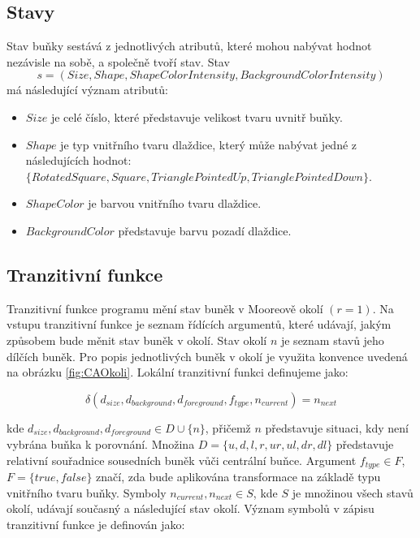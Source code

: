 \subsection*{Stavy}
Stav buňky sestává z jednotlivých atributů, které mohou nabývat hodnot nezávisle na sobě, a společně tvoří stav.
Stav
$$s = (Size, Shape, ShapeColorIntensity, BackgroundColorIntensity)$$ 
má následující význam atributů:

\begin{itemize}
    \item $Size$ je celé číslo, které představuje velikost tvaru uvnitř buňky.
    \item $Shape$ je typ vnitřního tvaru dlaždice, který může nabývat jedné z následujících hodnot: $\{RotatedSquare, Square, TrianglePointedUp, TrianglePointedDown\}$.
    \item $ShapeColor$ je barvou vnitřního tvaru dlaždice.
    \item $BackgroundColor$ představuje barvu pozadí dlaždice.
\end{itemize}

\subsection*{Tranzitivní funkce}
Tranzitivní funkce programu mění stav buněk v Mooreově okolí $(r = 1)$. Na vstupu tranzitivní funkce je seznam řídících argumentů, které udávají, jakým způsobem bude měnit stav buněk v okolí. Stav okolí $n$ je seznam stavů jeho dílčích buněk. Pro popis jednotlivých buněk v okolí je využita konvence uvedená na obrázku \ref{fig:CAOkoli}. Lokální tranzitivní funkci definujeme jako:

$$\delta(d_{size}, d_{background}, d_{foreground}, f_{type}, n_{current}) = n_{next} $$ 

kde $d_{size}, d_{background}, d_{foreground} \in D \cup \{n\}$, přičemž $n$ představuje situaci, kdy není vybrána buňka k porovnání. Množina $D = \{u, d, l, r, ur, ul, dr, dl\}$ představuje relativní souřadnice sousedních buněk vůči centrální buňce.   Argument $f_{type} \in F$, $F = \{true, false\}$ značí, zda bude aplikována transformace na základě typu vnitřního tvaru buňky. Symboly $ n_{current}, n_{next} \in S$, kde $S$ je množinou všech stavů okolí, udávají současný a následující stav okolí. Význam symbolů v zápisu tranzitivní funkce je definován jako:

